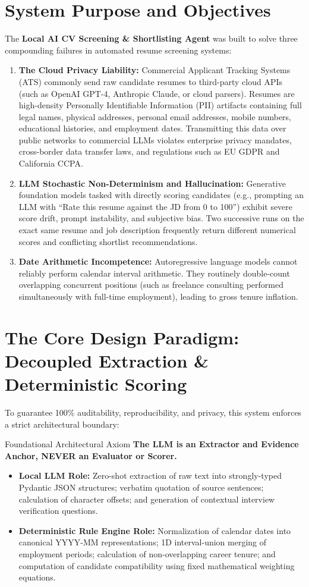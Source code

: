 \documentclass[11pt,a4paper]{report}
\begin{document}
\section{System Purpose and Objectives}
The \textbf{Local AI CV Screening \& Shortlisting Agent} was built to solve three compounding failures in automated resume screening systems:
\begin{enumerate}[label=\textbf{(\alph*)}]
    \item \textbf{The Cloud Privacy Liability:} Commercial Applicant Tracking Systems (ATS) commonly send raw candidate resumes to third-party cloud APIs (such as OpenAI GPT-4, Anthropic Claude, or cloud parsers). Resumes are high-density Personally Identifiable Information (PII) artifacts containing full legal names, physical addresses, personal email addresses, mobile numbers, educational histories, and employment dates. Transmitting this data over public networks to commercial LLMs violates enterprise privacy mandates, cross-border data transfer laws, and regulations such as EU GDPR and California CCPA.
    \item \textbf{LLM Stochastic Non-Determinism and Hallucination:} Generative foundation models tasked with directly scoring candidates (e.g., prompting an LLM with ``Rate this resume against the JD from 0 to 100'') exhibit severe score drift, prompt instability, and subjective bias. Two successive runs on the exact same resume and job description frequently return different numerical scores and conflicting shortlist recommendations.
    \item \textbf{Date Arithmetic Incompetence:} Autoregressive language models cannot reliably perform calendar interval arithmetic. They routinely double-count overlapping concurrent positions (such as freelance consulting performed simultaneously with full-time employment), leading to gross tenure inflation.
\end{enumerate}

\section{The Core Design Paradigm: Decoupled Extraction \& Deterministic Scoring}
To guarantee 100\% auditability, reproducibility, and privacy, this system enforces a strict architectural boundary:
\begin{techbox}{Foundational Architectural Axiom}
\textbf{The LLM is an Extractor and Evidence Anchor, NEVER an Evaluator or Scorer.}
\begin{itemize}
    \item \textbf{Local LLM Role:} Zero-shot extraction of raw text into strongly-typed Pydantic JSON structures; verbatim quotation of source sentences; calculation of character offsets; and generation of contextual interview verification questions.
    \item \textbf{Deterministic Rule Engine Role:} Normalization of calendar dates into canonical YYYY-MM representations; 1D interval-union merging of employment periods; calculation of non-overlapping career tenure; and computation of candidate compatibility using fixed mathematical weighting equations.
\end{itemize}
\end{techbox}
\end{document}
